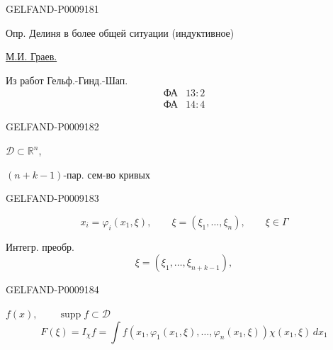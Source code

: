 \begin{GelfandAdjacentEvidence}{GELFAND-P000918}{1}

Опр. Делиня в более общей ситуации (индуктивное)

\uline{М.И. Граев.}

Из работ Гельф.-Гинд.-Шап.
\begin{equation*}
\begin{array}{ll}
 \text{ФА} & 13:2\\
 \text{ФА} & 14:4
\end{array}
\end{equation*}
\end{GelfandAdjacentEvidence}
\begin{GelfandAdjacentEvidence}{GELFAND-P000918}{2}


$\mathcal D\subset\mathbb R^n$,

$(n+k-1)$-пар. сем-во кривых
\end{GelfandAdjacentEvidence}
\begin{GelfandAdjacentEvidence}{GELFAND-P000918}{3}


\begin{equation*}
 x_i=\varphi_i(x_1,\xi),\qquad
 \xi=(\xi_1,\ldots,\xi_n),\qquad \xi\in\Gamma
\end{equation*}

Интегр. преобр.
\begin{equation*}
 \xi=(\xi_1,\ldots,\xi_{n+k-1}),
\end{equation*}
\end{GelfandAdjacentEvidence}
\begin{GelfandAdjacentEvidence}{GELFAND-P000918}{4}

$f(x),\qquad \operatorname{supp}f\subset\mathcal D$
\begin{equation*}
 F(\xi)=I_\chi f
 =\int f(x_1,\varphi_1(x_1,\xi),\ldots,\varphi_n(x_1,\xi))
         \chi(x_1,\xi)\,dx_1
\end{equation*}
\end{GelfandAdjacentEvidence}
